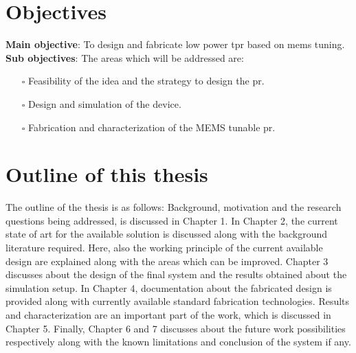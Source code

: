 \documentclass[../report.tex]{subfiles}
\begin{document}
	\section{Objectives}
\textbf{Main objective}: To design and fabricate low power \gls{tpr} based on \gls{mems} tuning. \\

\noindent \textbf{Sub objectives}: The areas which will be addressed are:
\begin{itemize}
	\item[$\square$] Feasibility of the idea and the strategy to design the \gls{pr}. 
	\item[$\square$] Design and simulation of the device.
	\item[$\square$] Fabrication and characterization of the MEMS tunable \gls{pr}.
\end{itemize}
	
	\section{Outline of this thesis}
The outline of the thesis is as follows: Background, motivation and the research questions being addressed, is discussed in Chapter 1. In Chapter 2, the current state of art for the available solution is discussed along with the background literature required. Here, also the working principle of the current available design are explained along with the areas which can be improved. Chapter 3 discusses about the design of the final system and the results obtained about the simulation setup. In Chapter 4, documentation about the fabricated design is provided along with currently available standard fabrication technologies. Results and characterization are an important part of the work, which is discussed in Chapter 5. Finally, Chapter 6 and 7 discusses about the future work possibilities respectively along with the known limitations and conclusion of the system if any.  
	
\end{document}
